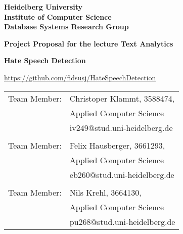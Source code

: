 \documentclass[
     12pt,         %
     a4paper,      %
     BCOR10mm,     %
     DIV14,        %
     ]{article}
\begin{document}
\begin{titlepage}

\vspace*{1cm}
\begin{center}
\textbf{ 
\Large Heidelberg University\\
\smallskip
\Large Institute of Computer Science\\
\smallskip
\Large Database Systems Research Group\\
\smallskip
}

\vspace{3cm}

\textbf{\large Project Proposal for the lecture Text Analytics}

\vspace{0.5\baselineskip}
{\huge
\textbf{Hate Speech Detection}
}
\vspace{0.5cm}

\url{https://github.com/fidsusj/HateSpeechDetection}
\end{center}

\vfill 

{\large
\begin{tabular}[l]{ll}
Team Member: & Christoper Klammt, 3588474,\\
  & Applied Computer Science\\
  & iv249@stud.uni-heidelberg.de\\
  & \\
Team Member: & Felix Hausberger, 3661293,\\
  & Applied Computer Science\\
  & eb260@stud.uni-heidelberg.de\\
  & \\
Team Member: & Nils Krehl, 3664130,\\
  & Applied Computer Science\\
  & pu268@stud.uni-heidelberg.de\\
  
\end{tabular}
}

\end{titlepage}









\newpage
\printbibliography
\end{document}

